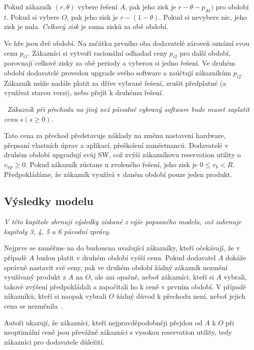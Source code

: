 \begin{multicols}{2}
	Pokud zákazník $(r,\theta)$ vybere řešení $A$, pak jeho zisk je $r-\theta - p_{At})$ pro období $t$. Pokud si vybere $O$, pak jeho zisk je $r-(1-\theta)$. Pokud si nevybere nic, jeho zisk je nula. {\em Celkový zisk} je suma zisků za obě období.

	Ve hře jsou dvě období. Na začátku prvního oba dodavatelé zároveň oznámí svou cenu $p_{i1}$. Zákazníci si vytvoří racionální odhadad ceny $p_{i2}$ pro další období, porovnají celkové zisky za obě periody a vyberou si jedno řešení. Ve druhém období dodavatelé provedou upgrade svého software a zaúčtují zákazníkům $p_{i2}$. Zákazník může nadále platit za dříve vybrané řešení, zrušit předplatné (a využívat starou verzi), nebo přejít k druhému řešení.

		\vspace{10pt}
		~{\em Zákazník při přechodu na jiný než původně vybraný software bude muset zaplatit cenu $s (s\geq0)$.}
		\vspace{10pt}

	Tato cena za přechod představuje náklady na změnu nastavení hardware, přepsaní vlastních úprav a aplikací, přeškolení zaměstnanců. Dodavatelé v druhém období upgradují svůj SW, což zvýší zákazníkovu reservation utility o $v_{up}\geq0$. Pokud zákazník zůstane u zvoleného řešení, jeho zisk je $0\leq v_b < R$. Předpokládáme, že zákazník využívá v daném období pouze jeden produkt.

	\subsection{Výsledky modelu}
	{\em V této kapitole shrnuji výsledky získané z výše popsaného modelu, což zahrnuje kapitoly 3, 4, 5 a 6 původní zprávy.}

	Nejprve se zaměřme na do budoucna uvažující zákazníky, kteří očekávají, že v případě $A$ budou platit v druhém období vyšší cenu. Pokud dodavatel $A$ dokáže správně nastavit své ceny, pak ve druhém období žádný zákazník nezmění využívaný produkt z $A$ na $O$, ale ani opačně, neboť zákazníci, kteří si $A$ vybrali, takové zvýšení předpokládali a započítali ho k ceně v prvním období. V případě zákazníků, kteří si naopak vybrali $O$ žádný důvod k přechodu není, neboť jejich cena se nezměnila~\cite[kap. 3: Lemma 1]{lock-in-competition}.

	Autoři ukazují, že zákazníci, kteří nejpravděpodobněji přejdou od $A$ k $O$ při neoptimální ceně jsou převážně zákazníci s vysokou reservation utility, tedy zákazníci pro dodavatele důležití.


\end{multicols}
